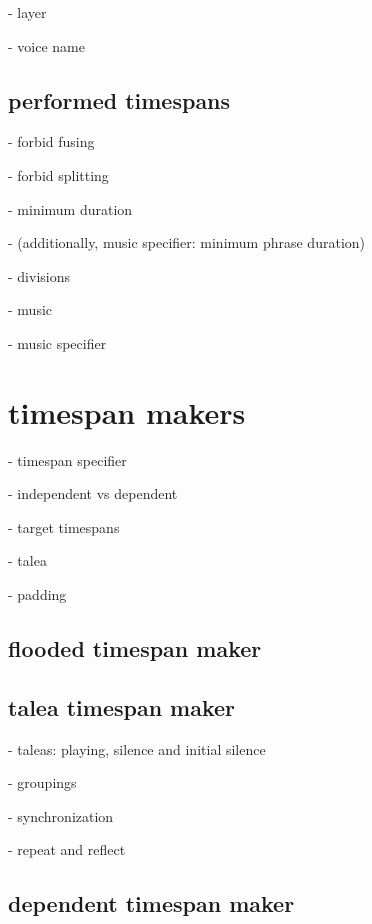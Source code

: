 - layer

- voice name

\subsection{performed timespans}

- forbid fusing

- forbid splitting

- minimum duration

- (additionally, music specifier: minimum phrase duration)

- divisions

- music

- music specifier

\section{timespan makers}

- timespan specifier

- independent vs dependent

- target timespans

- talea

- padding

\subsection{flooded timespan maker}

\subsection{talea timespan maker}

- taleas: playing, silence and initial silence

- groupings

- synchronization

- repeat and reflect

\subsection{dependent timespan maker}